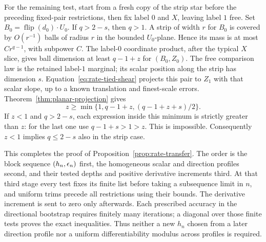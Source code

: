 For the remaining test, start from a fresh copy of the strip star before
the preceding fixed-pair restrictions, then fix label $0$ and $X$,
leaving label $1$ free. Set $B_0=\operatorname{flip}(d_0)\cdot U_0$. If $q>2-s$,
then $q>1$. A strip of width $r$ for $B_0$ is covered by $O(r^{-1})$
balls of radius $r$ in the bounded $U_0$-plane. Hence its mass is
at most $C r^{q-1}$, with subpower $C$. The label-$0$ coordinate
product, after the typical $X$ slice, gives ball dimension at least
$q-1+z$ for $(B_0,Z_0)$. The free comparison law is the retained
label-$1$ marginal; its scalar position along the strip has dimension
$s$. Equation~\eqref{eq:rate-tied-shear} projects this pair to
$Z_1$ with that scalar slope, up to a known translation and
finest-scale errors. Theorem~\ref{thm:planar-projection} gives
\[
 z\ge\min\{1,q-1+z,(q-1+z+s)/2\}.
\]
If $z<1$ and $q>2-s$, each expression inside this minimum is
strictly greater than $z$: for the last one use
$q-1+s>1>z$. This is impossible. Consequently $z<1$ implies
$q\le2-s$ also in the strip case.

This completes the proof of Proposition~\ref{prop:rate-transfer}.
The order is the block sequence $(h_n,\epsilon_n)$ first, the
homogeneous scalar and direction profiles second, and their tested
depths and positive derivative increments third. At that third stage
every test fixes its finite list before taking a subsequence limit
in $n$, and uniform trims precede all restrictions using their
bounds. The derivative increment is sent to zero only afterwards.
Each prescribed accuracy in the directional bootstrap requires
finitely many iterations; a diagonal over those finite tests proves
the exact inequalities. Thus neither a new $h_n$ chosen from a
later direction profile nor a uniform differentiability modulus
across profiles is required.

